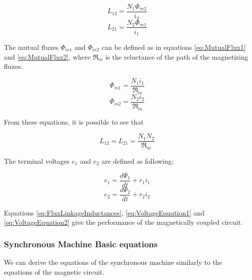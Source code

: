 \begin{equation}
	L_{12} = \frac{N_1 \Phi_{m2}}{i_2}
\end{equation}
\begin{equation}
	L_{21} = \frac{N_2 \Phi_{m1}}{i_1}
\end{equation}

The mutual fluxes $\Phi_{m1}$ and $\Phi_{m2}$ can be defined as in equations \ref{eq:MutualFlux1} and \ref{eq:MutualFlux2}, where $\Re_m$ is the reluctance of the path of the magnetizing fluxes. 

\begin{equation} \label{eq:MutualFlux1}
	\Phi_{m1} = \frac{N_1 i_1}{\Re_m} 
\end{equation} 
\begin{equation} \label{eq:MutualFlux2}
	\Phi_{m2} = \frac{N_2 i_2}{\Re_m} 
\end{equation}

From these equations, it is possible to see that

\begin{equation}
	L_{12}=L_{21}= \frac{N_1 N_2}{\Re_m}
\end{equation}

The terminal voltages $e_1$ and $e_2$ are defined as following:

\begin{equation} \label{eq:VoltageEquation1}
	e_1 = \frac{d \Psi_1}{d t} + r_1 i_1
\end{equation}
\begin{equation} \label{eq:VoltageEquation2}
	e_2 = \frac{d \Psi_2}{d t} + r_2 i_2
\end{equation}

Equations \ref{eq:FluxLinkageInductances}, \ref{eq:VoltageEquation1} and \ref{eq:VoltageEquation2} give the performance of the magnetically coupled circuit.

\subsubsection{Synchronous Machine Basic equations}

We can derive the equations of the synchronous machine similarly to the equations of the magnetic circuit.

